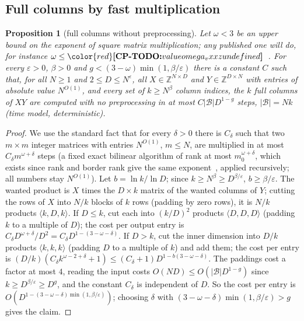 \documentclass[11pt]{article}
\makeatletter
\newtheorem{proposition}[theorem]{Proposition}
\theoremstyle{definition}
\theoremstyle{remark}
\DeclareRobustCommand{\CPTODO}[1]{{\color{red}\textbf{[CP-TODO:} #1\textbf{]}}}
\providecommand{\eps}{\varepsilon}
\providecommand{\Z}{\mathbb{Z}}
\newcommand{\abs}[1]{\lvert #1\rvert}
\newcommand{\mat}[3]{\langle #1,#2,#3\rangle} %
\newcommand{\Bt}{\mathcal B}                         %
\newcommand{\cpv}[1]{\ifcsname cpv@#1\endcsname\csname cpv@#1\endcsname\else\CPTODO{value #1 undefined}\fi}
\makeatother
\begin{document}
\subsection{Full columns by fast multiplication}\label{cp:sec:fastcols}

\begin{proposition}[full columns without preprocessing]\label{cp:B9}
Let $\omega<3$ be an upper bound on the exponent of square matrix multiplication; any published one will do, for instance $\omega\le\cpv{omega_vxxz}$~\cite{VXXZ24}. For every $\eps>0$, $\beta>0$ and $g<(3-\omega)\min(1,\beta/\eps)$ there is a constant $C$ such that, for all $N\ge1$ and $2\le D\le N^\eps$, all $X\in\Z^{N\times D}$ and $Y\in\Z^{D\times N}$ with entries of absolute value $N^{O(1)}$, and every set of $k\ge N^\beta$ column indices, the $k$ full columns of $XY$ are computed with no preprocessing in at most $C\abs\Bt D^{1-g}$ steps, $\abs\Bt=Nk$ (time model, deterministic).
\end{proposition}

\begin{proof}
We use the standard fact that for every $\delta>0$ there is $C_\delta$ such that two $m\times m$ integer matrices with entries $N^{O(1)}$, $m\le N$, are multiplied in at most $C_\delta m^{\omega+\delta}$ steps (a fixed exact bilinear algorithm of rank at most $m_0^{\omega+\delta}$, which exists since rank and border rank give the same exponent~\cite{Bin80}, applied recursively; all numbers stay $N^{O(1)}$). Let $b=\ln k/\ln D$; since $k\ge N^\beta\ge D^{\beta/\eps}$, $b\ge\beta/\eps$. The wanted product is $X$ times the $D\times k$ matrix of the wanted columns of $Y$; cutting the rows of $X$ into $N/k$ blocks of $k$ rows (padding by zero rows), it is $N/k$ products $\mat kDk$. If $D\le k$, cut each into $(k/D)^2$ products $\mat DDD$ (padding $k$ to a multiple of $D$); the cost per output entry is $C_\delta D^{\omega+\delta}/D^2=C_\delta D^{1-(3-\omega-\delta)}$. If $D>k$, cut the inner dimension into $D/k$ products $\mat kkk$ (padding $D$ to a multiple of $k$) and add them; the cost per entry is $(D/k)(C_\delta k^{\omega-2+\delta}+1)\le(C_\delta+1)D^{1-b(3-\omega-\delta)}$. The paddings cost a factor at most $4$, reading the input costs $O(ND)\le O(\abs\Bt D^{1-g})$ since $k\ge D^{\beta/\eps}\ge D^g$, and the constant $C_\delta$ is independent of $D$. So the cost per entry is $O(D^{1-(3-\omega-\delta)\min(1,\beta/\eps)})$; choosing $\delta$ with $(3-\omega-\delta)\min(1,\beta/\eps)>g$ gives the claim.
\end{proof}
\end{document}
